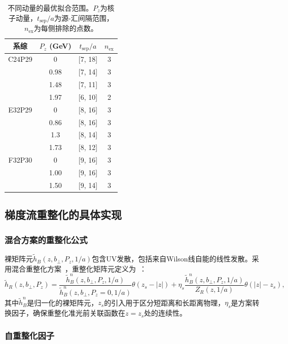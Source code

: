 \documentclass[12pt,a4paper]{ctexart}
\theoremstyle{definition}
\newcommand{\hB}{\tilde{h}_B}
\newcommand{\hR}{\tilde{h}_R}
\newcommand{\tsep}{t_{\text{sep}}}
\newcommand{\Pz}{P_z}
\newcommand{\bperp}{b_\perp}
\begin{document}
\begin{table}[H]
\centering
\caption{不同动量的最优拟合范围。$P_z$为核子动量，$\tsep/a$为源-汇间隔范围，$n_{\text{ex}}$为每侧排除的点数。}
\label{tab:fitting_ranges}
\begin{tabular}{cccc}
\toprule
系综 & $P_z$ (GeV) & $\tsep/a$ & $n_{\text{ex}}$ \\
\midrule
C24P29 & 0     & [7, 18] & 3 \\
        & 0.98  & [7, 14] & 3 \\
        & 1.48  & [7, 11] & 3 \\
        & 1.97  & [6, 10] & 2 \\
\midrule
E32P29 & 0     & [8, 16] & 3 \\
        & 0.86  & [8, 16] & 3 \\
        & 1.3   & [8, 14] & 3 \\
        & 1.73  & [8, 12] & 3 \\
\midrule
F32P30 & 0     & [9, 16] & 3 \\
        & 1.00  & [9, 16] & 3 \\
        & 1.50  & [9, 14] & 3 \\
\bottomrule
\end{tabular}
\end{table}

\subsection{梯度流重整化的具体实现}

\subsubsection{混合方案的重整化公式}

裸矩阵元$\hB(z, \bperp, \Pz, 1/a)$包含UV发散，包括来自Wilson线自能的线性发散。采用混合重整化方案~\cite{Ji:2020brr}，重整化矩阵元定义为~\cite{Chen2025gluon}：
\begin{equation}\label{eq:hybrid_renorm}
    \hR(z, \bperp, \Pz) = \frac{\hB^n(z, \bperp, \Pz, 1/a)}{\hB^n(z, \bperp, \Pz=0, 1/a)} \theta(z_s - |z|) + \eta_s \frac{\hB^n(z, \bperp, \Pz, 1/a)}{Z_R(z, 1/a)} \theta(|z| - z_s),
\end{equation}
其中$\hB^n$是归一化的裸矩阵元，$z_s$的引入用于区分短距离和长距离物理，$\eta_s$是方案转换因子，确保重整化准光前关联函数在$z = z_s$处的连续性。

\subsubsection{自重整化因子}
\end{document}
